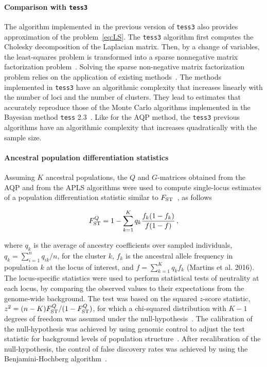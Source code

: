 \paragraph{Comparison with {\tt tess3}}  The algorithm implemented in the previous version of {\tt tess3} also provides approximation of the problem~\eqref{eq:LS}. The {\tt tess3} algorithm first computes the Cholesky decomposition of the Laplacian matrix. Then, by a change of variables, the least-squares problem is transformed into a sparse nonnegative matrix factorization problem~\citep{Caye2016}.  Solving the sparse non-negative matrix factorization problem relies on the application of existing methods~\citep{Kim2011, Frichot2014}. The methods implemented in {\tt tess3} have an algorithmic complexity that increases linearly with the number of loci and the number of clusters. They lead to estimates that accurately reproduce those of the Monte Carlo algorithms implemented in the Bayesian method {\tt tess} 2.3~\citep{Caye2016}. Like for the AQP method, the {\tt tess3} previous algorithms have an algorithmic complexity that increases quadratically with the sample size. 




\paragraph{Ancestral population differentiation statistics} Assuming $K$ ancestral populations, the $Q$ and $G$-matrices  obtained from the AQP and from the APLS algorithms were used to compute single-locus estimates of a population differentiation statistic similar to $F_{\rm ST}$~\citep{Martins2016}, as follows

$$
F^{Q}_{\rm ST} = 1 - \sum_{k=1}^K  q_k \frac{f_k (1-f_k)}{f(1-f)} \, ,
$$

\noindent where $q_k$ is the average of ancestry coefficients over sampled individuals, $q_k = \sum_{i =1}^n q_{ik}/n$, for the cluster $k$, $f_k$ is the ancestral allele frequency in population $k$ at the locus of interest, and $f = \sum_{k = 1}^K q_k f_k$ (Martins et al. 2016). The locus-specific statistics were used to perform statistical tests of neutrality at each locus, by comparing the observed values to their expectations from the genome-wide background. The test was based on the squared $z$-score statistic, $z^2 = (n-K) F^{Q}_{\rm ST}/(1 - F^{Q}_{\rm ST})$, for which a  chi-squared distribution with $K-1$ degrees of freedom was assumed under the null-hypothesis~\citep{Martins2016}. The calibration of the null-hypothesis was achieved by using genomic control to adjust the test statistic for background levels of population structure~\citep{Devlin1999, Francois2016}. After recalibration of the null-hypothesis, the control of false discovery rates was achieved by using the Benjamini-Hochberg algorithm~\citep{Benjamini1995}.


